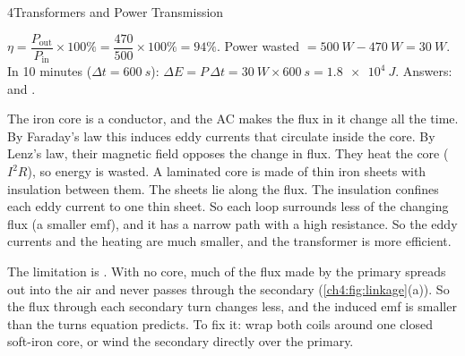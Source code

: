 \begin{chapteranswers}{4}{Transformers and Power Transmission}
  \item $\eta = \dfrac{P_\mathrm{out}}{P_\mathrm{in}} \times 100\%
        = \dfrac{470}{500} \times 100\% = 94\%$. Power wasted
        $= \qty{500}{W} - \qty{470}{W} = \qty{30}{W}$. In 10 minutes
        ($\Delta t = \qty{600}{s}$):
        $\Delta E = P\,\Delta t = \qty{30}{W} \times \qty{600}{s} = \qty{1.8e4}{J}$.
        Answers:  and .
  \item The iron core is a conductor, and the AC makes the flux in it change all the
        time. By Faraday's law this induces eddy currents that circulate inside the core.
        By Lenz's law, their magnetic field opposes the change in flux. They heat the core
        ($I^2R$), so energy is wasted. A laminated core is made of thin iron sheets with
        insulation between them. The sheets lie along the flux. The insulation confines
        each eddy current to one thin sheet. So each loop surrounds less of the changing
        flux (a smaller emf), and it has a narrow path with a high resistance. So the eddy
        currents and the heating are much smaller, and the transformer is more efficient.
        \begin{markingcriteria}
        \end{markingcriteria}
  \item The limitation is . With no core, much of the
        flux made by the primary spreads out into the air and never passes through the
        secondary (\cref{ch4:fig:linkage}(a)). So the flux through each secondary turn
        changes less, and the induced emf is smaller than the turns equation predicts.
        To fix it: wrap both coils around one closed soft-iron core, or wind the
        secondary directly over the primary.
        \begin{markingcriteria}

\end{markingcriteria}
\end{chapteranswers}
